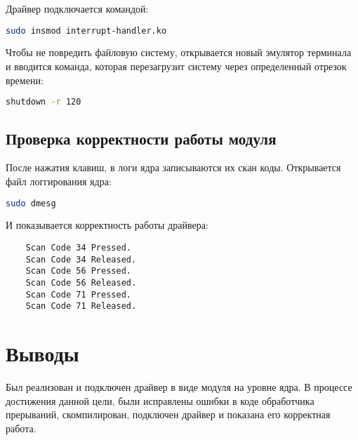 \documentclass[a4paper,11pt]{article}
\begin{document}
    Драйвер подключается командой:
    \begin{lstlisting}[language = bash]
    sudo insmod interrupt-handler.ko
    \end{lstlisting}

    Чтобы не повредить файловую систему, открывается новый эмулятор терминала
    и вводится команда, которая перезагрузит систему через определенный отрезок времени:
    \begin{lstlisting}[language = bash]
    shutdown -r 120
    \end{lstlisting}

  \subsection{Проверка корректности работы модуля}

    После нажатия клавиш, в логи ядра записываются их скан коды.
    Открывается файл логгирования ядра:
    \begin{lstlisting}[language = bash]
    sudo dmesg
    \end{lstlisting}

    И показывается корректность работы драйвера:
    \begin{lstlisting}
    Scan Code 34 Pressed.
    Scan Code 34 Released.
    Scan Code 56 Pressed.
    Scan Code 56 Released.
    Scan Code 71 Pressed.
    Scan Code 71 Released.
    \end{lstlisting}

\section{Выводы}
  Был реализован и подключен драйвер в виде модуля на уровне ядра.
  В процессе достижения данной цели, были исправлены ошибки в коде
  обработчика прерываний, скомпилирован, подключен драйвер и показана
  его корректная работа.
\end{document}
